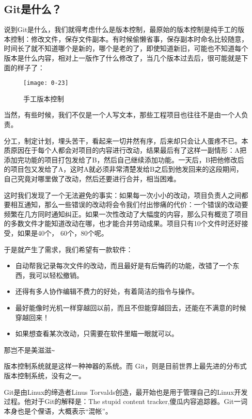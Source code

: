 \subsection{Git是什么？}
说到Git是什么，我们就得考虑什么是版本控制，最原始的版本控制是纯手工的版本控制：修改文件，保存文件副本。有时候偷懒省事，保存副本时命名比较随意，时间长了就不知道哪个是新的，哪个是老的了，即使知道新旧，可能也不知道每个版本是什么内容，相对上一版作了什么修改了，当几个版本过去后，很可能就是下面的样子了：
\begin{figure}[htbp]
  \centering
  \texttt{[image: 0-23]}
  \caption{手工版本控制}\label{fig:0-23}
\end{figure}

当然，有些时候，我们不仅是一个人写文本，那些工程项目也往往不是由一个人负责。

分工，制定计划，埋头苦干，看起来一切井然有序，后来却只会让人蛋疼不已。本质原因在于每个人都会对项目的内容进行改动，结果最后有了这样一副情形：A把添加完功能的项目打包发给了B，然后自己继续添加功能。一天后，B把他修改后的项目包又发给了A，这时A就必须非常清楚发给B之后到他发回来的这段期间，自己究竟对哪里做了改动，然后还要进行合并，相当困难。

这时我们发现了一个无法避免的事实：如果每一次小小的改动，项目负责人之间都要相互通知，那么一些错误的改动将会令我们付出惨痛的代价：一个错误的改动要频繁在几方同时通知纠正。如果一次性改动了大幅度的内容，那么只有概览了项目的多数文件才能知道改动在哪，也才能合并劳动成果。项目只有10个文件时还好接受，如果是40个， 60个，80个呢。

于是就产生了需求，我们希望有一款软件：
\begin{itemize}
    \item 自动帮我记录每次文件的改动，而且最好是有后悔药的功能，改错了一个东西，我可以轻松撤销。
	\item 还得有多人协作编辑不费力的好处，有着简洁的指令与操作。
	\item 最好能像时光机一样穿越回以前，而且不但能穿越回去，还能在不满意的时候穿越回来！
	\item 如果想查看某次改动，只需要在软件里瞄一眼就可以。
\end{itemize}

那岂不是美滋滋\verb|~|

版本控制系统就是这样一种神器的系统。而 Git，则是目前世界上最先进的分布式版本控制系统，没有之一。

Git是由Linux的缔造者Linus Torvalds创造，最开始也是用于管理自己的Linux开发过程。他对于Git的解释是：The stupid content tracker,傻瓜内容追踪器。Git一词本身也是个俚语，大概表示“混帐”。

